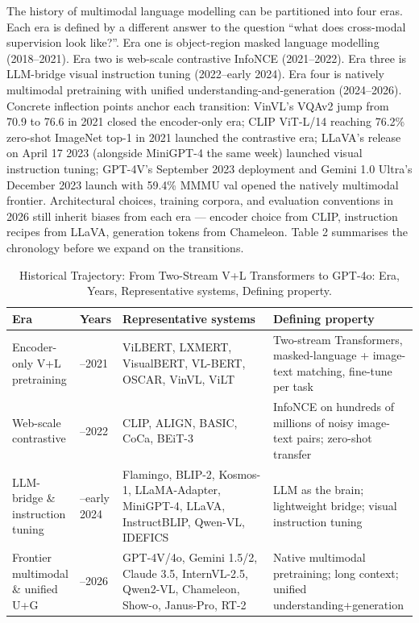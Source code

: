 \documentclass{article}
\begin{document}
The history of multimodal language modelling can be partitioned into four eras. Each era is defined by a different answer to the question ``what does cross-modal supervision look like?''. Era one is object-region masked language modelling (2018--2021). Era two is web-scale contrastive InfoNCE (2021--2022). Era three is LLM-bridge visual instruction tuning (2022--early 2024). Era four is natively multimodal pretraining with unified understanding-and-generation (2024--2026). Concrete inflection points anchor each transition: VinVL's VQAv2 jump from 70.9 to 76.6 in 2021 closed the encoder-only era; CLIP ViT-L/14 reaching 76.2\% zero-shot ImageNet top-1 in 2021 launched the contrastive era; LLaVA's release on April 17 2023 (alongside MiniGPT-4 the same week) launched visual instruction tuning; GPT-4V's September 2023 deployment and Gemini 1.0 Ultra's December 2023 launch with 59.4\% MMMU val opened the natively multimodal frontier. Architectural choices, training corpora, and evaluation conventions in 2026 still inherit biases from each era --- encoder choice from CLIP, instruction recipes from LLaVA, generation tokens from Chameleon. Table 2 summarises the chronology before we expand on the transitions.

\begin{table}[t]
\centering
\caption{Historical Trajectory: From Two-Stream V+L Transformers to GPT-4o: Era, Years, Representative systems, Defining property.}
\label{tab:historical-trajectory-from-two-stream-v-l-transformers-to-gp}
\begin{tabular}{>{\raggedright\arraybackslash}p{0.1467\linewidth}
  >{\raggedright\arraybackslash}p{0.0667\linewidth}
  >{\raggedright\arraybackslash}p{0.4222\linewidth}
  >{\raggedright\arraybackslash}p{0.3644\linewidth}}
\toprule
\textbf{Era} & \textbf{Years} & \textbf{Representative systems} & \textbf{Defining property} \\
\midrule
Encoder-only V+L pretraining & 2018--2021 & ViLBERT, LXMERT, VisualBERT, VL-BERT, OSCAR, VinVL, ViLT & Two-stream Transformers, masked-language + image-text matching, fine-tune per task \\
Web-scale contrastive & 2021--2022 & CLIP, ALIGN, BASIC, CoCa, BEiT-3 & InfoNCE on hundreds of millions of noisy image-text pairs; zero-shot transfer \\
LLM-bridge \& instruction tuning & 2022--early 2024 & Flamingo, BLIP-2, Kosmos-1, LLaMA-Adapter, MiniGPT-4, LLaVA, InstructBLIP, Qwen-VL, IDEFICS & LLM as the brain; lightweight bridge; visual instruction tuning \\
Frontier multimodal \& unified U+G & 2024--2026 & GPT-4V/4o, Gemini 1.5/2, Claude 3.5, InternVL-2.5, Qwen2-VL, Chameleon, Show-o, Janus-Pro, RT-2 & Native multimodal pretraining; long context; unified understanding+generation \\
\end{tabular}
\end{table}
\end{document}

